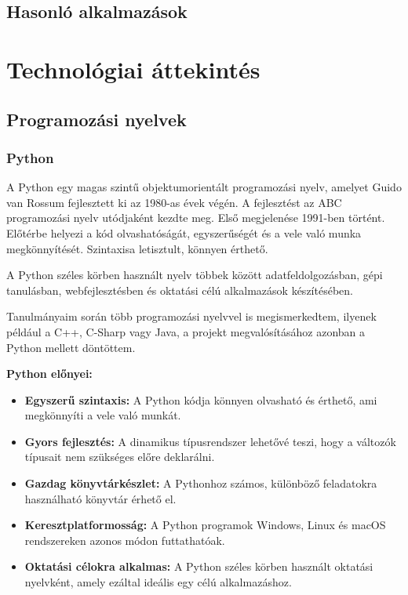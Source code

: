 \documentclass[]{thesis-ekf}
\begin{document}
	\section{Hasonló alkalmazások}
	
	\chapter{Technológiai áttekintés} 
	\section{Programozási nyelvek}
	
	\subsection{Python}
	
	A Python\cite{Python} egy magas szintű objektumorientált programozási nyelv, amelyet Guido van Rossum fejlesztett ki az 1980-as évek végén. A fejlesztést az ABC programozási nyelv utódjaként kezdte meg. Első megjelenése 1991-ben történt. Előtérbe helyezi a kód olvashatóságát, egyszerűségét és a vele való munka megkönnyítését. Szintaxisa letisztult, könnyen érthető.
	
	A Python széles körben használt nyelv többek között adatfeldolgozásban, gépi tanulásban,	webfejlesztésben és oktatási célú alkalmazások készítésében.
	
	Tanulmányaim során több programozási nyelvvel is megismerkedtem, ilyenek például a C++\cite{C++}, C-Sharp\cite{C-Sharp} vagy Java\cite{Java}, a projekt megvalósításához azonban a Python mellett döntöttem.
	
	\textbf{Python előnyei:}
	\begin{itemize}
		\item \textbf{Egyszerű szintaxis:} A Python kódja könnyen olvasható és érthető, ami megkönnyíti a vele való munkát.
		\item \textbf{Gyors fejlesztés:} A dinamikus típusrendszer lehetővé teszi, hogy a változók típusait nem szükséges előre deklarálni.
		\item \textbf{Gazdag könyvtárkészlet:} A Pythonhoz számos, különböző feladatokra használható könyvtár érhető el.
		\item \textbf{Keresztplatformosság:} A Python programok Windows, Linux és macOS rendszereken azonos módon futtathatóak.
		\item \textbf{Oktatási célokra alkalmas:} A Python széles körben használt oktatási nyelvként, amely ezáltal ideális egy  célú alkalmazáshoz.
	\end{itemize}
	
\end{document}
